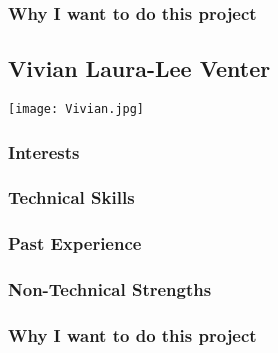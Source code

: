 \subsubsection{Why I want to do this project}

\subsection{Vivian Laura-Lee Venter}
\texttt{[image: Vivian.jpg]}

\subsubsection{Interests}
\subsubsection{Technical Skills}
\subsubsection{Past Experience}
\subsubsection{Non-Technical Strengths}
\subsubsection{Why I want to do this project}
